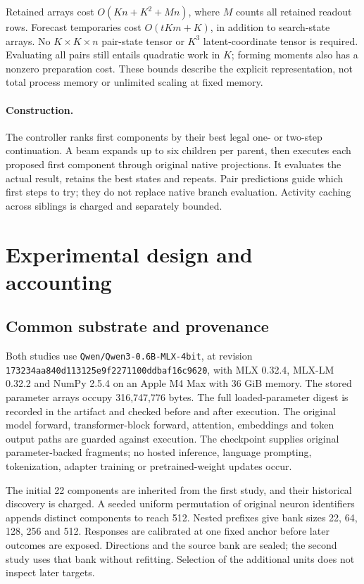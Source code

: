 \documentclass[11pt]{article}
\begin{document}
Retained arrays cost $O(Kn+K^2+Mn)$, where $M$ counts all retained readout rows.
Forecast temporaries cost $O(tKm+K)$, in addition to search-state arrays.
No $K\times K\times n$ pair-state tensor or $K^3$ latent-coordinate tensor is
required. Evaluating all pairs still entails quadratic work in $K$; forming
moments also has a nonzero preparation cost. These bounds describe the explicit
representation, not total process memory or unlimited scaling at fixed memory.

\paragraph{Construction.}
The controller ranks first components by their best legal one- or two-step
continuation. A beam expands up to six children per parent, then executes each
proposed first component through original native projections. It evaluates the
actual result, retains the best states and repeats. Pair predictions guide
which first steps to try; they do not replace native branch evaluation. Activity
caching across siblings is charged and separately bounded.

\section{Experimental design and accounting}
\subsection{Common substrate and provenance}
Both studies use \texttt{Qwen/Qwen3-0.6B-MLX-4bit}, at revision\\
\texttt{173234aa840d113125e9f2271100ddbaf16c9620}, with MLX 0.32.4,
MLX-LM 0.32.2 and NumPy 2.5.4 on an Apple M4 Max with 36 GiB memory.
The stored parameter arrays occupy 316,747,776 bytes. The full loaded-parameter
digest is recorded in the artifact and checked before and after execution.
The original model forward, transformer-block forward, attention, embeddings
and token output paths are guarded against execution. The checkpoint supplies
original parameter-backed fragments; no hosted inference, language prompting,
tokenization, adapter training or pretrained-weight updates occur.

The initial 22 components are inherited from the first study, and their
historical discovery is charged. A seeded uniform permutation of original
neuron identifiers appends distinct components to reach 512. Nested prefixes
give bank sizes 22, 64, 128, 256 and 512. Responses are calibrated at one fixed
anchor before later outcomes are exposed. Directions and the source bank are
sealed; the second study uses that bank without refitting. Selection of the
additional units does not inspect later targets.
\end{document}
